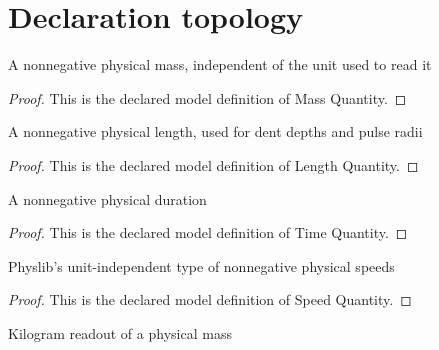 \section{Declaration topology}
\begin{definition}
  \label{def:physics:phyx-mini-0304:phyxminiproblems-problemphyxmini0304-massquantity}
  A nonnegative physical mass, independent of the unit used to read it
\end{definition}
\begin{proof}
  This is the declared model definition of Mass Quantity.
\end{proof}
\begin{definition}
  \label{def:physics:phyx-mini-0304:phyxminiproblems-problemphyxmini0304-lengthquantity}
  A nonnegative physical length, used for dent depths and pulse radii
\end{definition}
\begin{proof}
  This is the declared model definition of Length Quantity.
\end{proof}
\begin{definition}
  \label{def:physics:phyx-mini-0304:phyxminiproblems-problemphyxmini0304-timequantity}
  A nonnegative physical duration
\end{definition}
\begin{proof}
  This is the declared model definition of Time Quantity.
\end{proof}
\begin{definition}
  \label{def:physics:phyx-mini-0304:phyxminiproblems-problemphyxmini0304-speedquantity}
  Physlib's unit-independent type of nonnegative physical speeds
\end{definition}
\begin{proof}
  This is the declared model definition of Speed Quantity.
\end{proof}
\begin{definition}
  \label{def:physics:phyx-mini-0304:phyxminiproblems-problemphyxmini0304-massinkilograms}
  Kilogram readout of a physical mass
\end{definition}
